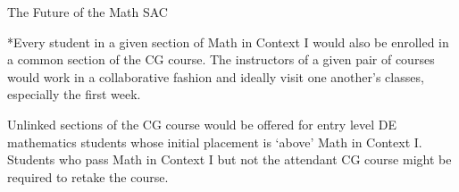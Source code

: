 \documentclass{beamer}
\begin{document}
\begin{frame}{The Future of the Math SAC}


\makebox[\textwidth][c]{%
  
  }

*Every student in a given section of Math in Context I 
would also be enrolled in a common section of the CG 
course.  The instructors of a given pair of courses 
would work in a collaborative fashion and ideally visit 
one another's classes, especially the first week. 

Unlinked sections of the CG course would be offered 
for entry level DE mathematics students whose initial 
placement is `above' Math in Context I.  Students who 
pass Math in Context I but not the attendant CG course 
might be required to retake the course.

\end{frame}
\end{document}
